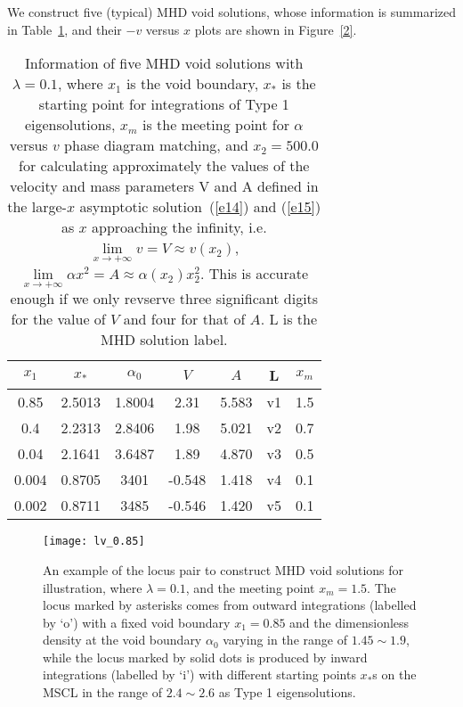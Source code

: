 \documentclass[fleqn,usenatbib]{mnras}
\begin{document}
We construct five (typical) MHD void solutions, whose information is summarized in Table~\ref{t1}, and their $-v$ versus $x$ plots are shown in Figure~\ref{2}. 

\begin{table}
  \centering
  \caption{Information of five MHD void solutions with $\lambda=0.1$, where $x_{1}$ is the void boundary, $x_{*}$ is the starting point for integrations of Type 1 eigensolutions, $x_{m}$ is the meeting point for $\alpha$ versus $v$ phase diagram matching, and $x_{2}=500.0$ for calculating approximately the values of the velocity and mass parameters V and A defined in the large-$x$ asymptotic solution~(\ref{e14}) and (\ref{e15}) as $x$ approaching the infinity, i.e. $\lim\limits_{x\rightarrow +\infty} v=V\approx v(x_{2})$, $\lim\limits_{x\rightarrow +\infty}\alpha x^{2}=A\approx \alpha(x_{2})x_{2}^{2}$. This is accurate enough if we only revserve three significant digits for the value of $V$ and four for that of $A$. L is the MHD solution label.}
    \begin{tabular}{ccccccc}
    \hline
    $x_{1}$ & $x_{*}$ & $\alpha_{0}$ & $V$ & $A$ & L & $x_{m}$\\
    \hline
    0.85 & 2.5013 & 1.8004 & 2.31 & 5.583 & v1 & 1.5\\
    0.4 & 2.2313 & 2.8406 & 1.98 & 5.021 & v2 & 0.7\\
    0.04 & 2.1641 & 3.6487 & 1.89 & 4.870 & v3 & 0.5\\
    0.004 & 0.8705 & 3401 & -0.548 & 1.418 & v4 & 0.1\\
    0.002 & 0.8711 & 3485 & -0.546 & 1.420 & v5 & 0.1\\
    \hline
    \end{tabular}
    \label{t1}
\end{table}    

\begin{figure}
\centering
\texttt{[image: lv\_0.85]}
\caption{
An example of the locus pair to construct MHD void solutions for illustration, where $\lambda=0.1$, and the meeting point $x_{m}=1.5$. The locus marked by asterisks comes from outward integrations (labelled by `o') with a fixed void boundary $x_{1}=0.85$ and the dimensionless density at the void boundary $\alpha_{0}$ varying in the range of $1.45\sim 1.9$, while the locus marked by solid dots is produced by inward integrations (labelled by `i') with different starting points $x_{*}$s on the MSCL in the range of $2.4\sim 2.6$ as Type 1 eigensolutions.
 }
\label{1}
\end{figure}
\end{document}
